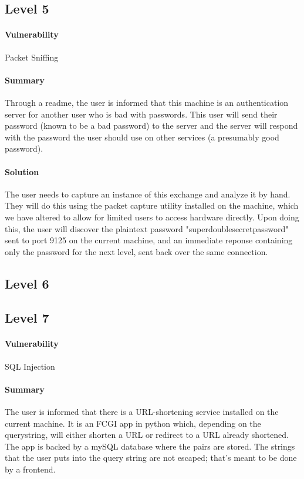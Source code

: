 \documentclass[12pt]{article}
\begin{document}
\subsection{Level 5}
\paragraph{Vulnerability} Packet Sniffing
\paragraph{Summary}  Through a readme, the user is informed that this machine
is an authentication server for another user who is bad with passwords.  This user
will send their password (known to be a bad password) to the server and the server
will respond with the password the user should use on other services (a presumably good
password).
\paragraph{Solution}  The user needs to capture an instance of this exchange and analyze it by hand.
They will do this using the packet capture utility installed on the machine, which we have altered
to allow for limited users to access hardware directly.  Upon doing this, the user will discover
the plaintext password "superdoublesecretpassword" sent to port 9125 on the current machine,
and an immediate reponse containing only the password for the next level, sent back over the same
connection.
\subsection{Level 6}

\subsection{Level 7}
\paragraph{Vulnerability} SQL Injection
\paragraph{Summary} The user is informed that there is a URL-shortening service installed on the current
machine.  It is an FCGI app in python which, depending on the querystring, will either shorten a URL
or redirect to a URL already shortened.  The app is backed by a mySQL database where the pairs are stored.
The strings that the user puts into the query string are not escaped; that's meant to be done by a frontend.
\end{document}
